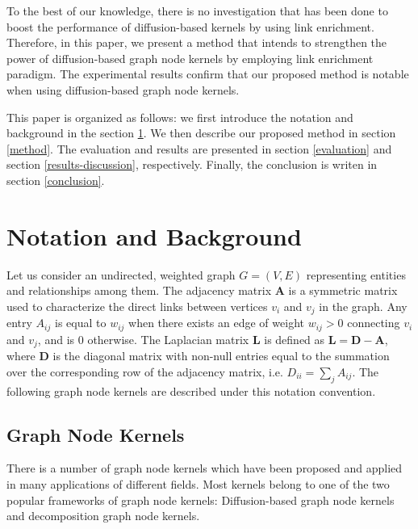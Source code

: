 \documentclass{article}
\begin{document}
To the best of our knowledge, there is no investigation that has been done to boost the performance of diffusion-based kernels by using link enrichment. Therefore, in this paper, we present a method that intends to strengthen the power of diffusion-based graph node kernels by employing link enrichment paradigm. The experimental results confirm that our proposed method is notable when using diffusion-based graph node kernels.

This paper is organized as follows: we first introduce the notation and background in the section \ref{background}. We then describe our proposed method in section \ref{method}. The evaluation and results are presented in section \ref{evaluation} and section \ref{results-discussion}, respectively. Finally, the conclusion is writen in section \ref{conclusion}.

\section{Notation and Background}
\label{background}
Let us consider an undirected, weighted graph $G = (V, E)$ representing entities and relationships among them. The adjacency matrix $\textbf{A}$ is a symmetric matrix used to characterize the direct links between vertices $v_{i}$ and $v_{j}$ in the graph. Any entry $A_{ij}$ is equal to $w_{ij}$ when there exists an edge of weight $w_{ij}>0$ connecting $v_{i}$ and $v_{j}$, and is 0 otherwise. The Laplacian matrix $\textbf{L}$ is defined as $\textbf{L} = \textbf{D}-\textbf{A}$, where $\textbf{D}$ is the diagonal matrix with non-null entries equal to the summation over the corresponding row of the adjacency matrix, i.e. $D_{ii}=\sum_j A_{ij}$. The following graph node kernels are described under this notation convention. 
\subsection{Graph Node Kernels}
There is a number of graph node kernels which have been proposed and applied in many applications of different fields. Most kernels belong to one of the two popular frameworks of graph node kernels: Diffusion-based graph node kernels and decomposition graph node kernels. 
\end{document}
